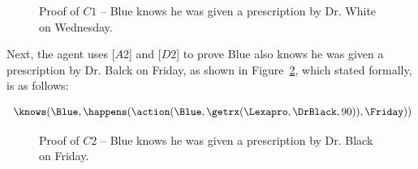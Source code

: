 \begin{figure}[h!] 
\vspace{6pt}
\label{fig:proof-of-c1}
\centering
{}
\caption{Proof of $C1$ -- Blue knows he was given a prescription by Dr. White on 
Wednesday.}
\end{figure}

\noindent Next, the agent uses [$A2$] and [$D2$] to prove Blue also knows he was given a prescription by Dr. Balck on Friday, as shown in Figure~\ref{fig:proof-of-c2}, which stated formally, is as follows:
\begin{footnotesize}
\begin{align*}
[C2] \ \knows(\Blue,\happens(\action(\Blue,\getrx(\Lexapro,\DrBlack,90)),\Friday))
\end{align*}
\end{footnotesize}

\begin{figure}[h!] 
\vspace{6pt}
\label{fig:proof-of-c2}
\centering
{}
\caption{Proof of $C2$ -- Blue knows he was given a prescription by Dr. Black on 
Friday.}
\end{figure}


